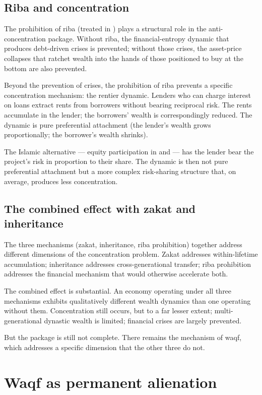 \subsection{Riba and concentration}

The prohibition of riba (treated in ) plays
a structural role in the anti-concentration package. Without
riba, the financial-entropy dynamic that produces debt-driven
crises is prevented; without those crises, the asset-price
collapses that ratchet wealth into the hands of those positioned
to buy at the bottom are also prevented.

Beyond the prevention of crises, the prohibition of riba prevents
a specific concentration mechanism: the rentier dynamic. Lenders
who can charge interest on loans extract rents from borrowers
without bearing reciprocal risk. The rents accumulate in the
lender; the borrowers' wealth is correspondingly reduced. The
dynamic is pure preferential attachment (the lender's wealth grows
proportionally; the borrower's wealth shrinks).

The Islamic alternative --- equity participation in
 and  --- has the lender bear the
project's risk in proportion to their share. The dynamic is then
not pure preferential attachment but a more complex risk-sharing
structure that, on average, produces less concentration.

\subsection{The combined effect with zakat and inheritance}

The three mechanisms (zakat, inheritance, riba prohibition)
together address different dimensions of the concentration
problem. Zakat addresses within-lifetime accumulation;
inheritance addresses cross-generational transfer; riba prohibition
addresses the financial mechanism that would otherwise accelerate
both.

The combined effect is substantial. An economy operating under all
three mechanisms exhibits qualitatively different wealth dynamics
than one operating without them. Concentration still occurs, but
to a far lesser extent; multi-generational dynastic wealth is
limited; financial crises are largely prevented.

But the package is still not complete. There remains the
mechanism of waqf, which addresses a specific dimension that the
other three do not.

\section{Waqf as permanent alienation}
\label{sec:perm-waqf}

